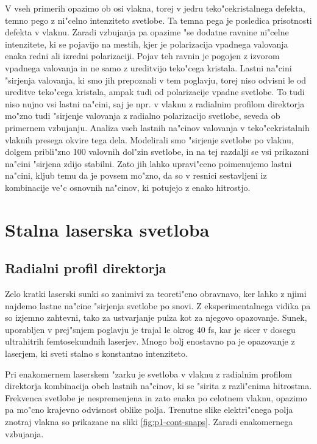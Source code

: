 \documentclass[12pt,twoside,openright,final,a4paper]{report}
\begin{document}
V vseh primerih opazimo ob osi vlakna, torej v jedru teko"cekristalnega defekta, temno pego z ni"celno intenziteto svetlobe. 
Ta temna pega je posledica prisotnosti defekta v vlaknu. 
Zaradi vzbujanja pa opazime "se dodatne ravnine ni"celne intenzitete, ki se pojavijo na mestih, kjer je polarizacija vpadnega valovanja enaka redni ali izredni polarizaciji. 
Pojav teh ravnin je pogojen z izvorom vpadnega valovanja in ne samo z ureditvijo teko"cega kristala. 
Lastni na"cini "sirjenja valovanja, ki smo jih prepoznali v tem poglavju, torej niso odvisni le od ureditve teko"cega kristala, ampak tudi od polarizacije vpadne svetlobe. 
To tudi niso nujno vsi lastni na"cini, saj je npr. v vlaknu z radialnim profilom direktorja mo"zno tudi "sirjenje valovanja z radialno polarizacijo svetlobe, seveda ob primernem vzbujanju. 
Analiza vseh lastnih na"cinov valovanja v teko"cekristalnih vlaknih presega okvire tega dela. 
Modelirali smo "sirjenje svetlobe po vlaknu, dolgem pribli"zno 100 valovnih dol"zin svetlobe, in na tej razdalji se vsi prikazani na"cini "sirjena zdijo stabilni. 
Zato jih lahko upravi"ceno poimenujemo lastni na"cini, kljub temu da je povsem mo"zno, da so v resnici sestavljeni iz kombinacije ve"c osnovnih na"cinov, ki potujejo z enako hitrostjo. 

\chapter{Stalna laserska svetloba}

\section{Radialni profil direktorja}

Zelo kratki laserski sunki so zanimivi za teoreti"cno obravnavo, ker lahko z njimi najdemo lastne na"cine "sirjenja svetlobe po snovi. 
Z eksperimentalnega vidika pa so izjemno zahtevni, tako za ustvarjanje pulza kot za njegovo opazovanje. 
Sunek, uporabljen v prej"snjem poglavju je trajal le okrog 40 fs, kar je sicer v dosegu ultrahitrih femtosekundnih laserjev. 
Mnogo bolj enostavno pa je opazovanje z laserjem, ki sveti stalno s konstantno intenziteto. 

Pri enakomernem laserskem "zarku je svetloba v vlaknu z radialnim profilom direktorja kombinacija obeh lastnih na"cinov, ki se "sirita z razli"cnima hitrostma. 
Frekvenca svetlobe je nespremenjena in zato enaka po celotnem vlaknu, opazimo pa mo"cno krajevno odvisnost oblike polja. 
Trenutne slike elektri"cnega polja znotraj vlakna so prikazane na sliki \ref{fig:p1-cont-snaps}. 
Zaradi enakomernega vzbujanja. 
\end{document}
